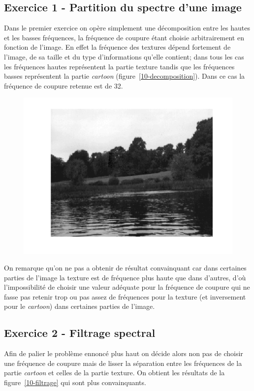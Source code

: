 \documentclass{article}
\begin{document}
\subsection{Exercice 1 - Partition du spectre d'une image}
Dans le premier exercice on opère simplement une décomposition entre les hautes et les basses fréquences, la fréquence de coupure étant choisie arbitrairement en fonction de l'image. En effet la fréquence des textures dépend fortement de l'image, de sa taille et du type d'informations qu'elle contient; dans tous les cas les fréquences hautes représentent la partie texture tandis que les fréquences basses représentent la partie \emph{cartoon} (figure~\ref{10-decomposition}). Dans ce cas la fréquence de coupure retenue est de 32.

\begin{figure}[!ht]
\includegraphics[width=\textwidth]{images/1/1-1-autumn_b.png}
\end{figure}

On remarque qu'on ne pas a obtenir de résultat convainquant car dans certaines parties de l'image la texture est de fréquence plus haute que dans d'autres, d'où l'impossibilité de choisir une valeur adéquate pour la fréquence de coupure qui ne fasse pas retenir trop ou pas assez de fréquences pour la texture (et inversement pour le \emph{cartoon}) dans certaines parties de l'image.

\subsection{Exercice 2 - Filtrage spectral}
Afin de palier le problème ennoncé plus haut on décide alors non pas de choisir une fréquence de coupure mais de lisser la séparation entre les fréquences de la partie \emph{cartoon} et celles de la partie texture. On obtient les résultats de la figure~\ref{10-filtrage} qui sont plus convainquants.
\end{document}
